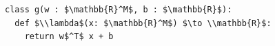 \documentclass[border=10pt]{standalone}
\begin{document}
\begin{lstlisting}
class g(w : $\mathbb{R}^M$, b : $\mathbb{R}$):
  def $\\lambda$(x: $\mathbb{R}^M$) $\to \\mathbb{R}$:
    return w$^T$ x + b
\end{lstlisting}
\end{document}
